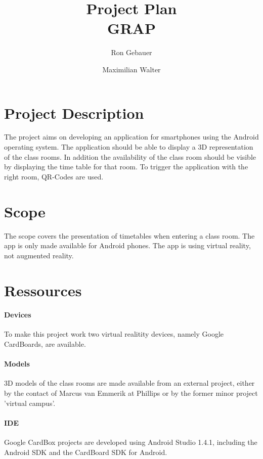 \documentclass[]{report}
\title{Project Plan \\GRAP}
\author{Ron Gebauer \and Maximilian Walter}
\begin{document}
\maketitle
\setcounter{chapter}{1}
\setcounter{section}{-1}
\section{Project Description}
The project aims on developing an application for smartphones using the Android operating system. The application should be able to display a 3D representation of the class rooms. In addition the availability of the class room should be visible by displaying the time table for that room. To trigger the application with the right room, QR-Codes are used. \\
\section{Scope}
The scope covers the presentation of timetables when entering a class room. The app is only made available for Android phones. The app is using virtual reality, not augmented reality. 
\section{Ressources}

\paragraph{Devices}
To make this project work two virtual realitity devices, namely Google CardBoards, are available. 
\paragraph{Models}
3D models of the class rooms are made available from an external project, either by the contact of Marcus van Emmerik at Phillips or by the former minor project 'virtual campus'. 
\paragraph{IDE}
Google CardBox projects are developed using Android Studio 1.4.1, including the Android SDK and the CardBoard SDK for Android.
\end{document}
